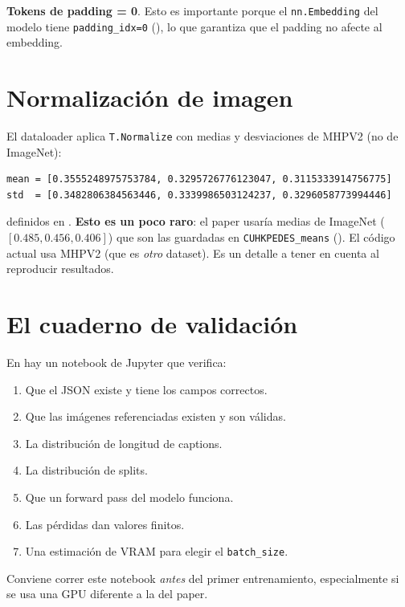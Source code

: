\noindent\textbf{Tokens de padding = 0}. Esto es importante
porque el \texttt{nn.Embedding} del modelo tiene
\texttt{padding\_idx=0} (),
lo que garantiza que el padding no afecte al embedding.

\section{Normalización de imagen}

El dataloader aplica \texttt{T.Normalize} con medias y desviaciones
de MHPV2 (no de ImageNet):

\begin{verbatim}
mean = [0.3555248975753784, 0.3295726776123047, 0.3115333914756775]
std  = [0.3482806384563446, 0.3339986503124237, 0.3296058773994446]
\end{verbatim}

\noindent definidos en . \textbf{Esto es
un poco raro}: el paper usaría medias de ImageNet ($[0.485, 0.456,
0.406]$) que son las guardadas en \texttt{CUHKPEDES\_means}
(). El código actual usa MHPV2 (que es
\emph{otro} dataset). Es un detalle a tener en cuenta al
reproducir resultados.

\section{El cuaderno de validación}

En  hay un
notebook de Jupyter que verifica:

\begin{enumerate}
  \item Que el JSON existe y tiene los campos correctos.
  \item Que las imágenes referenciadas existen y son válidas.
  \item La distribución de longitud de captions.
  \item La distribución de splits.
  \item Que un forward pass del modelo funciona.
  \item Las pérdidas dan valores finitos.
  \item Una estimación de VRAM para elegir el \texttt{batch\_size}.
\end{enumerate}

\noindent Conviene correr este notebook \emph{antes} del primer
entrenamiento, especialmente si se usa una GPU diferente a la
del paper.


